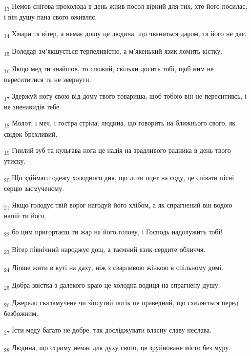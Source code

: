 \begin{tcolorbox}
\textsubscript{13} Немов снігова прохолода в день жнив посол вірний для тих, хто його посилає, і він душу пана свого оживляє.
\end{tcolorbox}
\begin{tcolorbox}
\textsubscript{14} Хмари та вітер, а немає дощу це людина, що чваниться даром, та його не дає.
\end{tcolorbox}
\begin{tcolorbox}
\textsubscript{15} Володар зм'якшується терпеливістю, а м'якенький язик ломить кістку.
\end{tcolorbox}
\begin{tcolorbox}
\textsubscript{16} Якщо мед ти знайшов, то спожий, скільки досить тобі, щоб ним не пересититися та не звернути.
\end{tcolorbox}
\begin{tcolorbox}
\textsubscript{17} Здержуй ногу свою від дому твого товариша, щоб тобою він не переситивсь, і не зненавидів тебе.
\end{tcolorbox}
\begin{tcolorbox}
\textsubscript{18} Молот, і меч, і гостра стріла, людина, що говорить на ближнього свого, як свідок брехливий.
\end{tcolorbox}
\begin{tcolorbox}
\textsubscript{19} Гнилий зуб та кульгава нога це надія на зрадливого радника в день твого утиску.
\end{tcolorbox}
\begin{tcolorbox}
\textsubscript{20} Що здіймати одежу холодного дня, що лити оцет на соду, це співати пісні серцю засмученому.
\end{tcolorbox}
\begin{tcolorbox}
\textsubscript{21} Якщо голодує твій ворог нагодуй його хлібом, а як спрагнений він водою напій ти його,
\end{tcolorbox}
\begin{tcolorbox}
\textsubscript{22} бо цим пригортаєш ти жар на його голову, і Господь надолужить тобі!
\end{tcolorbox}
\begin{tcolorbox}
\textsubscript{23} Вітер північний народжує дощ, а таємний язик сердите обличчя.
\end{tcolorbox}
\begin{tcolorbox}
\textsubscript{24} Ліпше жити в куті на даху, ніж з сварливою жінкою в спільному домі.
\end{tcolorbox}
\begin{tcolorbox}
\textsubscript{25} Добра звістка з далекого краю це холодна водиця на спрагнену душу.
\end{tcolorbox}
\begin{tcolorbox}
\textsubscript{26} Джерело скаламучене чи зіпсутий потік це праведний, що схиляється перед безбожним.
\end{tcolorbox}
\begin{tcolorbox}
\textsubscript{27} Їсти меду багато не добре, так досліджувати власну славу неслава.
\end{tcolorbox}
\begin{tcolorbox}
\textsubscript{28} Людина, що стриму немає для духу свого, це зруйноване місто без муру.
\end{tcolorbox}
